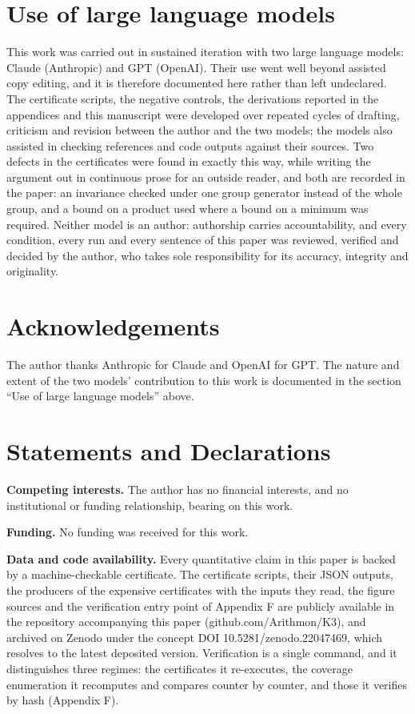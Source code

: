 \section{Use of large language models}\label{use-of-large-language-models}

This work was carried out in sustained iteration with two large language models: Claude (Anthropic) and GPT (OpenAI). Their use went well beyond assisted copy editing, and it is therefore documented here rather than left undeclared. The certificate scripts, the negative controls, the derivations reported in the appendices and this manuscript were developed over repeated cycles of drafting, criticism and revision between the author and the two models; the models also assisted in checking references and code outputs against their sources. Two defects in the certificates were found in exactly this way, while writing the argument out in continuous prose for an outside reader, and both are recorded in the paper: an invariance checked under one group generator instead of the whole group, and a bound on a product used where a bound on a minimum was required. Neither model is an author: authorship carries accountability, and every condition, every run and every sentence of this paper was reviewed, verified and decided by the author, who takes sole responsibility for its accuracy, integrity and originality.

\section{Acknowledgements}\label{acknowledgements}

The author thanks Anthropic for Claude and OpenAI for GPT. The nature and extent of the two models' contribution to this work is documented in the section ``Use of large language models'' above.

\section{Statements and Declarations}\label{statements-and-declarations}

\textbf{Competing interests.} The author has no financial interests, and no institutional or funding relationship, bearing on this work.

\textbf{Funding.} No funding was received for this work.

\textbf{Data and code availability.} Every quantitative claim in this paper is backed by a machine-checkable certificate. The certificate scripts, their JSON outputs, the producers of the expensive certificates with the inputs they read, the figure sources and the verification entry point of Appendix F are publicly available in the repository accompanying this paper (github.com/Arithmon/K3), and archived on Zenodo under the concept DOI 10.5281/zenodo.22047469, which resolves to the latest deposited version. Verification is a single command, and it distinguishes three regimes: the certificates it re-executes, the coverage enumeration it recomputes and compares counter by counter, and those it verifies by hash (Appendix F).


